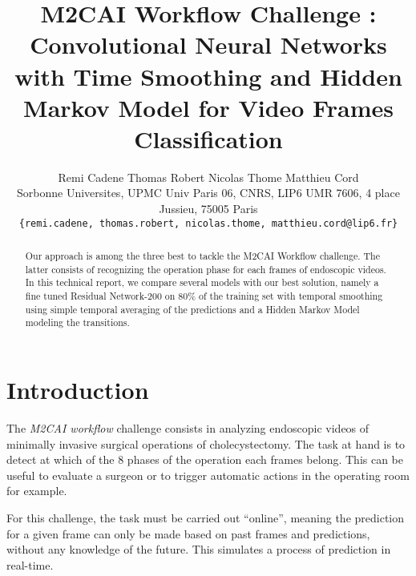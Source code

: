 \documentclass[10pt,twocolumn,letterpaper]{article}
\begin{document}
\title{M2CAI Workflow Challenge : Convolutional Neural Networks with Time Smoothing and Hidden Markov Model for Video Frames Classification}

\author{Remi Cadene \hspace{1cm} Thomas Robert \hspace{1cm} Nicolas Thome \hspace{1cm} Matthieu Cord\\
Sorbonne Universites, UPMC Univ Paris 06, CNRS, LIP6 UMR 7606, 4 place Jussieu, 75005 Paris\\
{\tt\small \{remi.cadene, thomas.robert, nicolas.thome, matthieu.cord@lip6.fr\}}
}

\maketitle

\begin{abstract}
Our approach is among the three best to tackle the M2CAI Workflow challenge. The latter consists of recognizing the operation phase for each frames of endoscopic videos. In this technical report, we compare several models with our best solution, namely a fine tuned Residual Network-200 on 80\% of the training set with temporal smoothing using simple temporal averaging of the predictions and a Hidden Markov Model modeling the transitions.
\end{abstract}

\section{Introduction}

The \emph{M2CAI workflow} challenge consists in analyzing endoscopic videos of
minimally invasive surgical operations of cholecystectomy. The task at hand is
to detect at which of the 8 phases of the operation each frames belong. This can
be useful to evaluate a surgeon or to trigger automatic actions in the operating
room for example.

For this challenge, the task must be carried out ``online'', meaning the prediction
for a given frame can only be made based on past frames and predictions, without
any knowledge of the future. This simulates a process of prediction in real-time.
\end{document}

